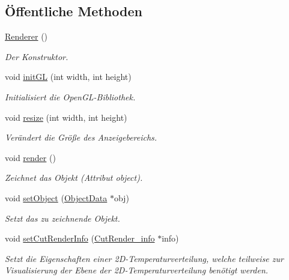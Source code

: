\subsection*{Öffentliche Methoden}
\begin{DoxyCompactItemize}
\item 
\hyperlink{classRenderer_a7ebf46f54dab9905f79b80f7fddb76a6}{Renderer} ()
\begin{DoxyCompactList}\small\item\em Der Konstruktor. \end{DoxyCompactList}\item 
void \hyperlink{classRenderer_a01887363ad27267e44c1ea0f63761a5c}{init\-G\-L} (int width, int height)
\begin{DoxyCompactList}\small\item\em Initialisiert die Open\-G\-L-\/\-Bibliothek. \end{DoxyCompactList}\item 
void \hyperlink{classRenderer_a9f4493c538688adaad4e4f0575fd3b8d}{resize} (int width, int height)
\begin{DoxyCompactList}\small\item\em Verändert die Größe des Anzeigebereichs. \end{DoxyCompactList}\item 
void \hyperlink{classRenderer_af7e5f8f68742f198e315fb4683a605a4}{render} ()
\begin{DoxyCompactList}\small\item\em Zeichnet das Objekt (Attribut object). \end{DoxyCompactList}\item 
void \hyperlink{classRenderer_a9db67fbbd309875b564ca1df08daf372}{set\-Object} (\hyperlink{classObjectData}{Object\-Data} $\ast$obj)
\begin{DoxyCompactList}\small\item\em Setzt das zu zeichnende Objekt. \end{DoxyCompactList}\item 
void \hyperlink{classRenderer_a566b30ae615b9cd74d481f360e0a567e}{set\-Cut\-Render\-Info} (\hyperlink{structUtils_1_1CutRender__info}{Cut\-Render\-\_\-info} $\ast$info)
\begin{DoxyCompactList}\small\item\em Setzt die Eigenschaften einer 2\-D-\/\-Temperaturverteilung, welche teilweise zur Visualisierung der Ebene der 2\-D-\/\-Temperaturverteilung benötigt werden. \end{DoxyCompactList}\item 

\end{DoxyCompactItemize}

